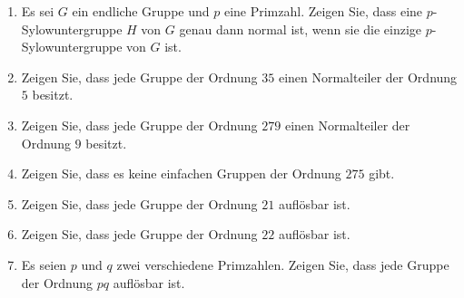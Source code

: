 \begin{question}[subtitle = Erste Sylowschritte]
  \begin{enumerate}
    \item
      Es sei $G$ ein endliche Gruppe und $p$ eine Primzahl.
      Zeigen Sie, dass eine $p$-Sylow\-un\-ter\-grup\-pe $H$ von $G$ genau dann normal ist, wenn sie die einzige $p$-Sylowuntergruppe von $G$ ist.
    \item
      Zeigen Sie, dass jede Gruppe der Ordnung $35$ einen Normalteiler der Ordnung $5$ besitzt.
    \item
      Zeigen Sie, dass jede Gruppe der Ordnung $279$ einen Normalteiler der Ordnung $9$ besitzt.
    \item
      Zeigen Sie, dass es keine einfachen Gruppen der Ordnung $275$ gibt.
    \item
      Zeigen Sie, dass jede Gruppe der Ordnung $21$ auflösbar ist.
    \item
      Zeigen Sie, dass jede Gruppe der Ordnung $22$ auflösbar ist.
    \item
      Es seien $p$ und $q$ zwei verschiedene Primzahlen.
      Zeigen Sie, dass jede Gruppe der Ordnung $pq$ auflösbar ist.
  \end{enumerate}
\end{question}


